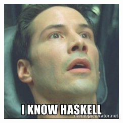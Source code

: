     \begin{frame}{}
        \vspace{2em}
        \pause
        \begin{center}
            \includegraphics[width=0.45\textwidth]{figs/iknowhaskell}
        \end{center}
    \end{frame}



